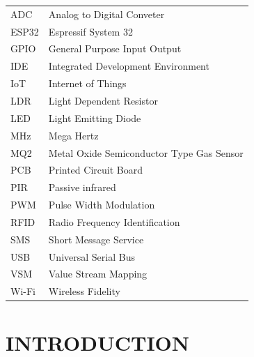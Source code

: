 \documentclass[12pt,a4paper]{report}
\begin{document}
	
	\vspace{0.1cm}
	\begin{justify}
		\begin{tabular}{l l}
		
			ADC & Analog to Digital Conveter \\
			ESP32 & Espressif System 32\\
			GPIO & General Purpose Input Output \\
			IDE & Integrated Development Environment\\
			IoT & Internet of Things \\	
			LDR & Light Dependent Resistor\\
			LED & Light Emitting Diode\\
			MHz &Mega Hertz\\
			MQ2 & Metal Oxide Semiconductor Type Gas Sensor\\
			PCB & Printed Circuit Board\\
			PIR & Passive infrared \\
			PWM & Pulse Width Modulation\\
			RFID & Radio Frequency Identification\\
			SMS & Short Message Service\\
			USB & Universal Serial Bus\\
			VSM & Value Stream Mapping\\
			Wi-Fi & Wireless Fidelity 
		
			
		\end{tabular}
		
		
		
	\end{justify}
	
	
	
	
	
	
	
	
	
	
	
	\chapter{INTRODUCTION}
	
\end{document}
